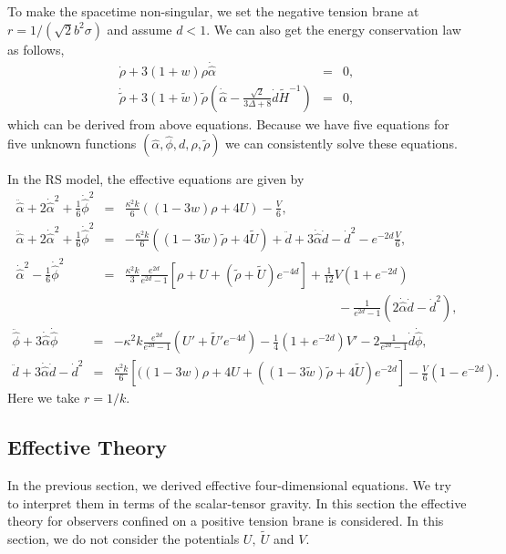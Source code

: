 \documentclass[a4paper,11pt]{article}
\begin{document}
To make the spacetime non-singular, we set the negative tension 
brane at $r=1/(\sqrt{2} b^2 \sigma)$ and assume $d < 1$. 
We can also get the energy conservation law 
as follows, 
\begin{eqnarray}
\dot{\rho} + 3(1+w)\rho\dot{\hat{\alpha}}&=& 0,  \\
\dot{\tilde{\rho}}+3(1+\tilde{w}) \tilde{\rho}
\left( \dot{\hat{\alpha}}- \frac{\sqrt{2}}{3\Delta +8} \dot{d} 
\tilde{H}^{-1} \right)
&=& 0,
\end{eqnarray}
which can be derived from above equations. 
Because we have five equations for
five unknown functions $(\hat{\alpha}, \hat{\phi}, d,\rho,\tilde{\rho})$
we can consistently solve these equations.

In the RS model, the effective equations are given by
\begin{eqnarray}
\ddot{\hat{\alpha}}+2 \dot{\hat{\alpha}}^2 + \frac{1}{6} \dot{\hat{\phi}}^2
&=& \frac{\kappa^2 k}{6}((1-3w)\rho +4U)- \frac{V}{6}, \\
\ddot{\hat{\alpha}}+2 \dot{\hat{\alpha}}^2 + \frac{1}{6} \dot{\hat{\phi}}^2
&=& -\frac{\kappa^2 k}{6}((1-3 \tilde{w})\tilde{\rho} +4 \tilde{U}) 
+\ddot{d}+3\dot{\hat{\alpha}}\dot{d}-\dot{d}^2
-e^{-2 d}\frac{V}{6}, \\
\dot{\hat{\alpha}}^2-\frac{1}{6} \dot{\hat{\phi}}^2 &=& \frac{\kappa^2 k}{3}
\frac{e^{2d}}{e^{2d}-1} \left[\rho+U +(\tilde{\rho}+\tilde{U})e^{-4d} \right]
+\frac{1}{12}V(1+e^{-2d}) \nonumber \\
& & \hspace{7cm}- \frac{1}{e^{2d}-1}(2 \dot{\hat{\alpha}}\dot{d}-\dot{d}^2),
\end{eqnarray}
\begin{eqnarray}
\ddot{\hat{\phi}}+3 \dot{\hat{\alpha}} \dot{\hat{\phi}} &=&
-\kappa^2 k \frac{e^{2d}}{e^{2d}-1} (U'+\tilde{U}'e^{-4d})
-\frac{1}{4}(1+e^{-2d})V'- 2 \frac{1}{e^{2d}-1} \dot{d} \dot{\hat{\phi}},
\\
\ddot{d}+3 \dot{\hat{\alpha}} \dot{d}-\dot{d}^2
&=&\frac{\kappa^2 k}{6} \left[( (1-3w) \rho +4 U+ 
((1-3 \tilde{w}) \tilde{\rho} +4 \tilde{U}) e^{-2 d}
\right]- \frac{V}{6}(1-e^{-2d}).
\end{eqnarray}
Here we take $r=1/k$.

\subsection{Effective Theory}
In the previous section, we derived effective four-dimensional equations.
We try to interpret them in terms of the scalar-tensor gravity. 
In this section the effective theory for 
observers confined on a positive tension brane is considered. 
In this section, we do not consider the potentials $U,\ \tilde{U}$ and $V$.
\end{document}
